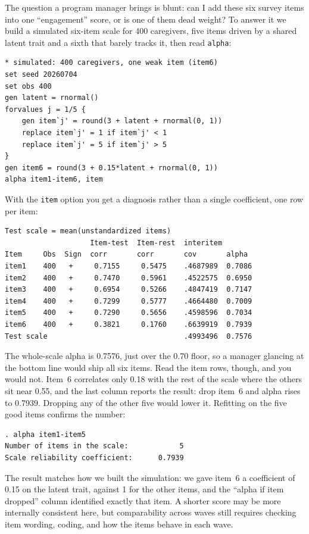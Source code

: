 The question a program manager brings is blunt: can I add these six survey items into one \enquote{engagement} score, or is one of them dead weight? To answer it we build a simulated six-item scale for 400 caregivers, five items driven by a shared latent trait and a sixth that barely tracks it, then read \texttt{alpha}:
\par
{\footnotesize
\begin{verbatim}
* simulated: 400 caregivers, one weak item (item6)
set seed 20260704
set obs 400
gen latent = rnormal()
forvalues j = 1/5 {
    gen item`j' = round(3 + latent + rnormal(0, 1))
    replace item`j' = 1 if item`j' < 1
    replace item`j' = 5 if item`j' > 5
}
gen item6 = round(3 + 0.15*latent + rnormal(0, 1))
alpha item1-item6, item
\end{verbatim}
}
With the \texttt{item} option you get a diagnosis rather than a single coefficient, one row per item:
\par
{\footnotesize
\begin{verbatim}
Test scale = mean(unstandardized items)
                    Item-test  Item-rest  interitem
Item     Obs  Sign  corr       corr       cov       alpha
item1    400   +     0.7155     0.5475    .4687989  0.7086
item2    400   +     0.7470     0.5961    .4522575  0.6950
item3    400   +     0.6954     0.5266    .4847419  0.7147
item4    400   +     0.7299     0.5777    .4664480  0.7009
item5    400   +     0.7290     0.5656    .4598596  0.7034
item6    400   +     0.3821     0.1760    .6639919  0.7939
Test scale                                .4993496  0.7576
\end{verbatim}
}
The whole-scale alpha is 0.7576, just over the 0.70 floor, so a manager glancing at the bottom line would ship all six items. Read the item rows, though, and you would not. Item~6 correlates only 0.18 with the rest of the scale where the others sit near 0.55, and the last column reports the result: drop item~6 and alpha rises to 0.7939. Dropping any of the other five would lower it. Refitting on the five good items confirms the number:
\par
{\footnotesize
\begin{verbatim}
. alpha item1-item5
Number of items in the scale:            5
Scale reliability coefficient:      0.7939
\end{verbatim}
}
The result matches how we built the simulation: we gave item~6 a coefficient of 0.15 on the latent trait, against 1 for the other items, and the \enquote{alpha if item dropped} column identified exactly that item. A shorter score may be more internally consistent here, but comparability across waves still requires checking item wording, coding, and how the items behave in each wave.

